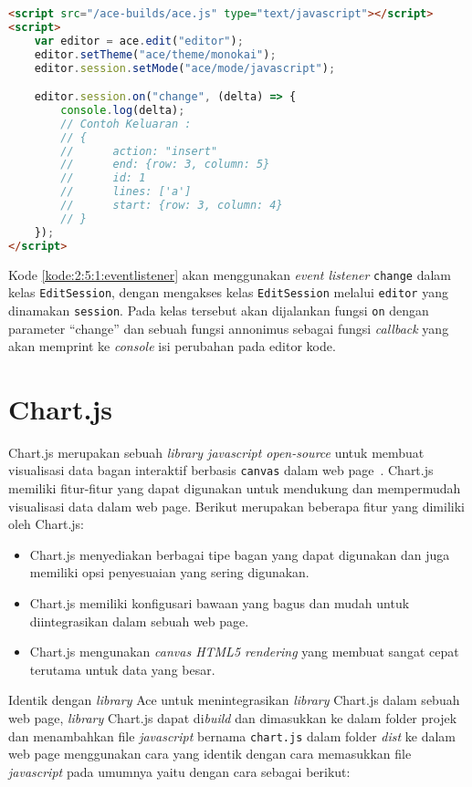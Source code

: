\begin{lstlisting}[language={html}, caption={Contoh kode event listener}, label={kode:2:5:1:eventlistener}]
<script src="/ace-builds/ace.js" type="text/javascript"></script>
<script>
	var editor = ace.edit("editor");
	editor.setTheme("ace/theme/monokai");
	editor.session.setMode("ace/mode/javascript");

	editor.session.on("change", (delta) => {
        console.log(delta);
		// Contoh Keluaran :
		// {
		// 		action: "insert"
		// 		end: {row: 3, column: 5}
		// 		id: 1
		// 		lines: ['a']
		// 		start: {row: 3, column: 4}
		// }
	});
</script>
\end{lstlisting}

Kode \ref{kode:2:5:1:eventlistener} akan menggunakan \textit{event listener} \verb|change| dalam kelas \verb|EditSession|, dengan mengakses kelas \verb|EditSession| melalui \verb|editor| yang dinamakan \verb|session|. Pada kelas tersebut akan dijalankan fungsi \verb|on| dengan parameter ``change'' dan sebuah fungsi annonimus sebagai fungsi \textit{callback} yang akan memprint ke \textit{console} isi perubahan pada editor kode.

\section{Chart.js}

Chart.js merupakan sebuah \textit{library javascript open-source} untuk membuat visualisasi data bagan interaktif berbasis \verb|canvas| dalam web page~\cite{chartjs}. Chart.js memiliki fitur-fitur yang dapat digunakan untuk mendukung dan mempermudah visualisasi data dalam web page. Berikut merupakan beberapa fitur yang dimiliki oleh Chart.js:

\begin{itemize}
	\item Chart.js menyediakan berbagai tipe bagan yang dapat digunakan dan juga memiliki opsi penyesuaian yang sering digunakan.
	\item Chart.js memiliki konfigusari bawaan yang bagus dan mudah untuk diintegrasikan dalam sebuah web page.
	\item Chart.js mengunakan \textit{canvas HTML5 rendering} yang membuat sangat cepat terutama untuk data yang besar.
\end{itemize}
 
Identik dengan \textit{library} Ace untuk menintegrasikan \textit{library} Chart.js dalam sebuah web page, \textit{library} Chart.js dapat di\textit{build} dan dimasukkan ke dalam folder projek dan menambahkan file \textit{javascript} bernama \verb|chart.js| dalam folder \textit{dist} ke dalam web page menggunakan cara yang identik dengan cara memasukkan file \textit{javascript} pada umumnya yaitu dengan cara sebagai berikut:

